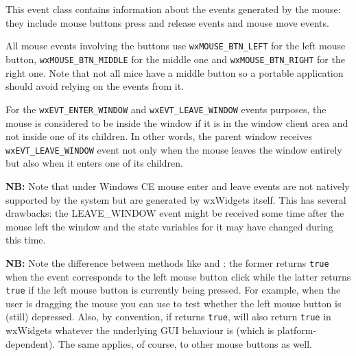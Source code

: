\section{}\label{wxmouseevent}

This event class contains information about the events generated by the mouse:
they include mouse buttons press and release events and mouse move events.

All mouse events involving the buttons use {\tt wxMOUSE\_BTN\_LEFT} for the
left mouse button, {\tt wxMOUSE\_BTN\_MIDDLE} for the middle one and
{\tt wxMOUSE\_BTN\_RIGHT} for the right one. Note that not all mice have a
middle button so a portable application should avoid relying on the events from
it.

For the \texttt{wxEVT\_ENTER\_WINDOW} and \texttt{wxEVT\_LEAVE\_WINDOW} events
purposes, the mouse is considered to be inside the window if it is in the
window client area and not inside one of its children. In other words, the
parent window receives \texttt{wxEVT\_LEAVE\_WINDOW} event not only when the
mouse leaves the window entirely but also when it enters one of its children.

{\bf NB:} Note that under Windows CE mouse enter and leave events are not natively supported
by the system but are generated by wxWidgets itself. This has several
drawbacks: the LEAVE\_WINDOW event might be received some time after the mouse
left the window and the state variables for it may have changed during this
time.

{\bf NB:} Note the difference between methods like
 and
: the former returns {\tt true}
when the event corresponds to the left mouse button click while the latter
returns {\tt true} if the left mouse button is currently being pressed. For
example, when the user is dragging the mouse you can use
 to test
whether the left mouse button is (still) depressed. Also, by convention, if
 returns {\tt true},
 will also return {\tt true} in
wxWidgets whatever the underlying GUI behaviour is (which is
platform-dependent). The same applies, of course, to other mouse buttons as
well.




